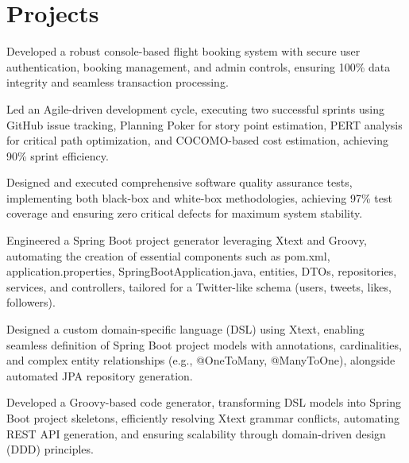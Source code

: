 \documentclass[]{resumebb}
\begin{document}
\section{\Large Projects}
\vspace{2pt}
{}
\begin{tightemize}
    \item Developed a robust console-based flight booking system with secure user authentication, booking management, and admin controls, ensuring 100\% data integrity and seamless transaction processing.
    \item Led an Agile-driven development cycle, executing two successful sprints using GitHub issue tracking, Planning Poker for story point estimation, PERT analysis for critical path optimization, and COCOMO-based cost estimation, achieving 90\% sprint efficiency.
    \item Designed and executed comprehensive software quality assurance tests, implementing both black-box and white-box methodologies, achieving 97\% test coverage and ensuring zero critical defects for maximum system stability.
\end{tightemize}
\sectionsep
{}
\begin{tightemize}
    \item Engineered a Spring Boot project generator leveraging Xtext and Groovy, automating the creation of essential components such as pom.xml, application.properties, SpringBootApplication.java, entities, DTOs, repositories, services, and controllers, tailored for a Twitter-like schema (users, tweets, likes, followers).
    \item Designed a custom domain-specific language (DSL) using Xtext, enabling seamless definition of Spring Boot project models with annotations, cardinalities, and complex entity relationships (e.g., @OneToMany, @ManyToOne), alongside automated JPA repository generation.
    \item Developed a Groovy-based code generator, transforming DSL models into Spring Boot project skeletons, efficiently resolving Xtext grammar conflicts, automating REST API generation, and ensuring scalability through domain-driven design (DDD) principles.
\end{tightemize}
\end{document}
